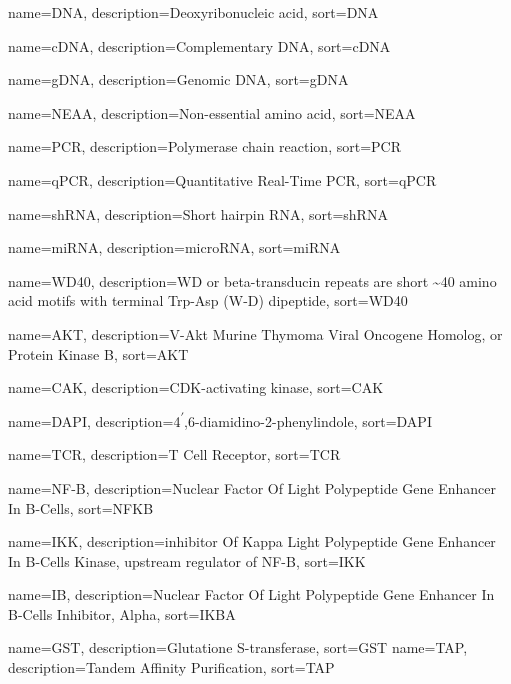 {
  name=DNA,
  description={Deoxyribonucleic acid},
  sort=DNA
}

{
  name=cDNA,
  description={Complementary DNA},
  sort=cDNA
}

{
  name=gDNA,
  description={Genomic DNA},
  sort=gDNA
}

{
  name=NEAA,
  description={Non-essential amino acid},
  sort=NEAA
}

{
  name=PCR,
  description={Polymerase chain reaction},
  sort=PCR
}

{
  name=qPCR,
  description={Quantitative Real-Time PCR},
  sort=qPCR
}

{
  name=shRNA,
  description={Short hairpin RNA},
  sort=shRNA
}

{
  name=miRNA,
  description={microRNA},
  sort=miRNA
}

{
  name=WD40,
  description={WD or beta-transducin repeats are short \textasciitilde 40 amino acid motifs with terminal Trp-Asp (W-D) dipeptide},
  sort=WD40
}

{
  name=AKT,
  description={V-Akt Murine Thymoma Viral Oncogene Homolog, or Protein Kinase B},
  sort=AKT
}

{
  name=CAK,
  description={CDK-activating kinase},
  sort=CAK
}

{
  name=DAPI,
  description={4\textsuperscript{$\prime$},6-diamidino-2-phenylindole},
  sort=DAPI
}

{
  name=TCR,
  description={T Cell Receptor},
  sort=TCR
}

{
  name=NF-\textkappa{}B,
  description={Nuclear Factor Of \textkappa{} Light Polypeptide Gene Enhancer In B-Cells},
  sort=NFKB
}


{
  name=IKK,
  description={inhibitor Of Kappa Light Polypeptide Gene Enhancer In B-Cells Kinase, upstream regulator of NF-\textkappa{}B},
  sort=IKK
}

{
  name=I\textkappa{}B\textalpha,
  description={Nuclear Factor Of \textkappa{} Light Polypeptide Gene Enhancer In B-Cells
Inhibitor, Alpha},
  sort=IKBA
}

{
  name=GST,
  description={Glutatione S-transferase},
  sort=GST
}
{
  name=TAP,
  description={Tandem Affinity Purification},
  sort=TAP
}

